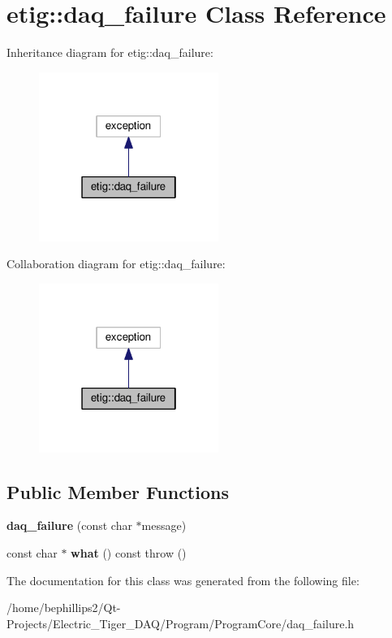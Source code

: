 \hypertarget{classetig_1_1daq__failure}{}\section{etig\+:\+:daq\+\_\+failure Class Reference}
\label{classetig_1_1daq__failure}


Inheritance diagram for etig\+:\+:daq\+\_\+failure\+:\nopagebreak
\begin{figure}[H]
\begin{center}
\leavevmode
\includegraphics[width=166pt]{classetig_1_1daq__failure__inherit__graph}
\end{center}
\end{figure}


Collaboration diagram for etig\+:\+:daq\+\_\+failure\+:\nopagebreak
\begin{figure}[H]
\begin{center}
\leavevmode
\includegraphics[width=166pt]{classetig_1_1daq__failure__coll__graph}
\end{center}
\end{figure}
\subsection*{Public Member Functions}
\begin{DoxyCompactItemize}
\item 
{\bfseries daq\+\_\+failure} (const char $\ast$message)\hypertarget{classetig_1_1daq__failure_a47f1bcf6385dc3f7107246ab0ae0259e}{}\label{classetig_1_1daq__failure_a47f1bcf6385dc3f7107246ab0ae0259e}

\item 
const char $\ast$ {\bfseries what} () const   throw ()\hypertarget{classetig_1_1daq__failure_a70e933a799676e24b6facb725f14492a}{}\label{classetig_1_1daq__failure_a70e933a799676e24b6facb725f14492a}

\end{DoxyCompactItemize}


The documentation for this class was generated from the following file\+:\begin{DoxyCompactItemize}
\item 
/home/bephillips2/\+Qt-\/\+Projects/\+Electric\+\_\+\+Tiger\+\_\+\+D\+A\+Q/\+Program/\+Program\+Core/daq\+\_\+failure.\+h\end{DoxyCompactItemize}
